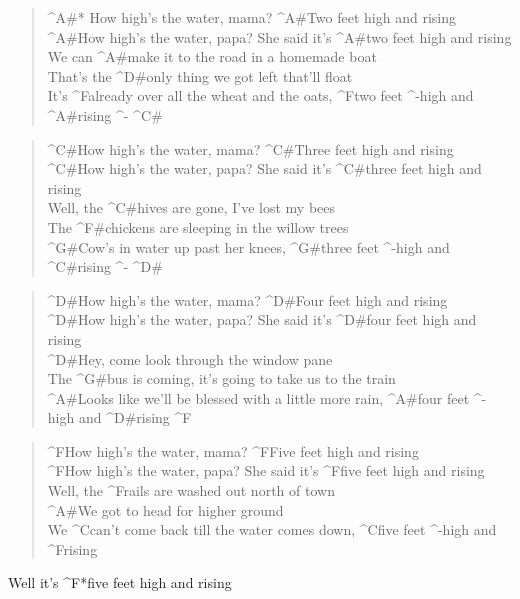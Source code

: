 \begin{verse}
^{A#*} How high's the water, mama? ^{A#}Two feet high and rising \\
^{A#}How high's the water, papa? She said it's ^{A#}two feet high and rising \\

We can ^{A#}make it to the road in a homemade boat \\
That's the ^{D#}only thing we got left that'll float \\
It's ^{F}already over all the wheat and the oats, ^{F}two feet ^{-}high and ^{A#}rising ^{-} \hspace{20pt} ^{C#}
\end{verse}

\begin{verse}
^{C#}How high's the water, mama? ^{C#}Three feet high and rising \\
^{C#}How high's the water, papa? She said it's ^{C#}three feet high and rising \\

Well, the ^{C#}hives are gone, I've lost my bees \\
The ^{F#}chickens are sleeping in the willow trees \\
^{G#}Cow's in water up past her knees, ^{G#}three feet ^{-}high and ^{C#}rising ^{-} \hspace{20pt} ^{D#}
\end{verse}

\begin{verse}
^{D#}How high's the water, mama? ^{D#}Four feet high and rising \\
^{D#}How high's the water, papa? She said it's ^{D#}four feet high and rising \\

^{D#}Hey, come look through the window pane \\
The ^{G#}bus is coming, it's going to take us to the train \\
^{A#}Looks like we'll be blessed with a little more rain, ^{A#}four feet ^{-}high and ^{D#}rising  \hspace{20pt} ^{F}
\end{verse}

\begin{verse}
^{F}How high's the water, mama? ^{F}Five feet high and rising \\
^{F}How high's the water, papa? She said it's ^{F}five feet high and rising \\

Well, the ^{F}rails are washed out north of town \\
^{A#}We got to head for higher ground \\
We ^{C}can't come back till the water comes down, ^{C}five feet ^{-}high and ^{F}rising \\
\end{verse}

\begin{outro}
Well it's ^{F*}five feet high and rising
\end{outro}
